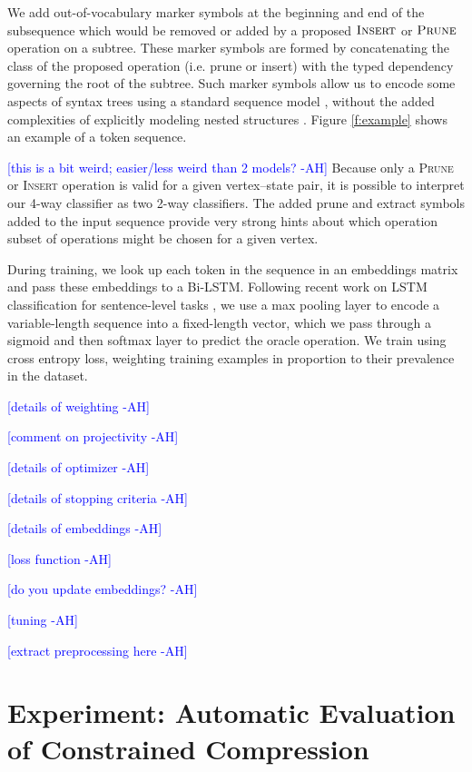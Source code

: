 \documentclass[11pt,a4paper]{article}
\newcommand{\ahcomment}[1]{\textcolor{blue}{[#1 -AH]}}
\begin{document}
We add out-of-vocabulary marker symbols at the beginning and end of the subsequence which would be removed or added by a proposed $\textsc{Insert}$ or $\textsc{Prune}$ operation on a subtree. These marker symbols are formed by concatenating the class of the proposed operation (i.e. prune or insert) with the typed dependency governing the root of the subtree. Such marker symbols allow us to encode some aspects of syntax trees using a standard sequence model \cite{Aharoni2017TowardsSN}, without the added complexities of explicitly modeling nested structures \cite{Tai2015ImprovedSR,Dyer2016RecurrentNN}. Figure \ref{f:example} shows an example of a token sequence. 

\ahcomment{this is a bit weird; easier/less weird than 2 models?} Because only a \textsc{Prune} or \textsc{Insert} operation is valid for a given vertex--state pair, it is possible to interpret our 4-way classifier as two 2-way classifiers. The added prune and extract symbols added to the input sequence provide very strong hints about which operation subset of operations might be chosen for a given vertex. 

During training, we look up each token in the sequence in an embeddings matrix and pass these embeddings to a Bi-LSTM. Following recent work on LSTM classification for sentence-level tasks \cite{D17-1070}, we use a max pooling layer to encode a variable-length sequence into a fixed-length vector, which we pass through a sigmoid and then softmax layer to predict the oracle operation. We train using cross entropy loss, weighting training examples in proportion to their prevalence in the dataset. 


\ahcomment{details of weighting}

\ahcomment{comment on projectivity}

\ahcomment{details of optimizer}

\ahcomment{details of stopping criteria}

\ahcomment{details of embeddings}

\ahcomment{loss function}

\ahcomment{do you update embeddings?}

\ahcomment{tuning}

\ahcomment{extract preprocessing here}




\section{Experiment: Automatic Evaluation of Constrained Compression}
\end{document}
